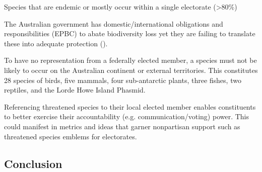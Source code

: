 \documentclass[a4paper,11pt]{article}
\begin{document}
Species that are endemic or mostly occur within a single electorate (>80\%)

The Australian government has domestic/international obligations and responsibilities (EPBC) to abate biodiversity loss yet they are failing to translate these into adequate protection (\cite{simmondsVulnerableSpeciesEcosystems2020,wardLotsLossLittle2019}).



To have no representation from a federally elected member, a species must not be likely to occur on the Australian continent or external territories. This constitutes 28 species of birds, five mammals, four sub-antarctic plants, three fishes, two reptiles, and the Lorde Howe Island Phasmid. 


Referencing threatened species to their local elected member enables constituents to better exercise their accountability (e.g. communication/voting) power. This could manifest in metrics and ideas that garner nonpartisan support such as threatened species emblems for electorates. 




\subsection{Conclusion}
\end{document}
